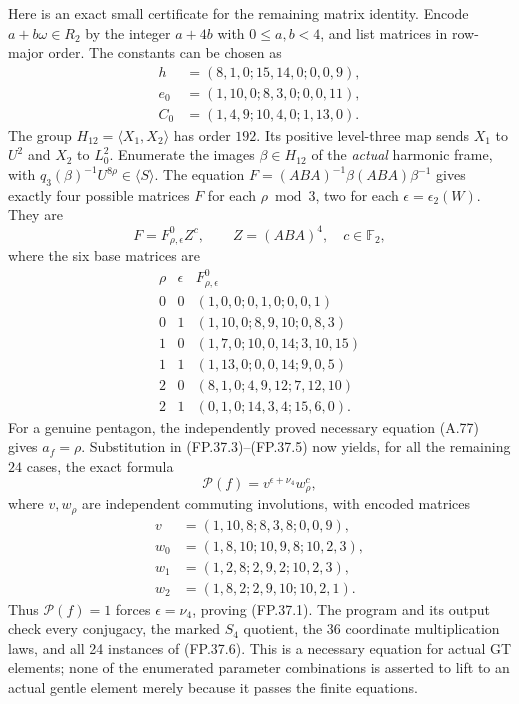 Here is an exact small certificate for the remaining matrix
identity. Encode $a+b\omega\in R_2$ by the integer $a+4b$
with $0\leq a,b<4$, and list matrices in row-major order.
The constants can be chosen as
\[
\begin{split}
 h&=(8,1,0;15,14,0;0,0,9),\\
 e_0&=(1,10,0;8,3,0;0,0,11),\\
 C_0&=(1,4,9;10,4,0;1,13,0).
\end{split}
\]
The group $H_{12}=\langle X_1,X_2\rangle$ has order $192$.
Its positive level-three map sends $X_1$ to $U^2$ and $X_2$
to $L_0^2$. Enumerate the images $\beta\in H_{12}$ of the
\emph{actual} harmonic frame, with
$q_3(\beta)^{-1}U^{8\rho}\in\langle S\rangle$.
The equation $F=(ABA)^{-1}\beta(ABA)\beta^{-1}$ gives
exactly four possible matrices $F$ for each $\rho\bmod3$,
two for each $\epsilon=\epsilon_2(W)$. They are
\[
                   F=F^0_{\rho,\epsilon}Z^c,
             \qquad Z=(ABA)^4,\quad c\in\mathbb F_2,
\]
where the six base matrices are
\[
\begin{array}{c|c|l}
 \rho&\epsilon&F^0_{\rho,\epsilon}\\ \hline
0&0&(1,0,0;0,1,0;0,0,1)\\
0&1&(1,10,0;8,9,10;0,8,3)\\
1&0&(1,7,0;10,0,14;3,10,15)\\
1&1&(1,13,0;0,0,14;9,0,5)\\
2&0&(8,1,0;4,9,12;7,12,10)\\
2&1&(0,1,0;14,3,4;15,6,0).
\end{array}
\]
For a genuine pentagon, the independently proved necessary
equation (A.77) gives $a_f=\rho$.
Substitution in (FP.37.3)--(FP.37.5)
now yields, for all the remaining $24$ cases, the exact formula
\[
                  \mathcal P(f)=v^{\epsilon+\nu_4}w_\rho^c,
 \tag{FP.37.6}
\]
where $v,w_\rho$ are independent commuting involutions, with
encoded matrices
\[
\begin{split}
 v&=(1,10,8;8,3,8;0,0,9),\\
 w_0&=(1,8,10;10,9,8;10,2,3),\\
 w_1&=(1,2,8;2,9,2;10,2,3),\\
 w_2&=(1,8,2;2,9,10;10,2,1).
\end{split}
\]
Thus $\mathcal P(f)=1$ forces $\epsilon=\nu_4$, proving
(FP.37.1). The program
 and its output
check every conjugacy, the marked $S_4$ quotient, the 36
coordinate multiplication laws, and all 24 instances of
(FP.37.6). This is a necessary equation for actual GT elements;
none of the enumerated parameter combinations is asserted to
lift to an actual gentle element merely because it passes the
finite equations.

